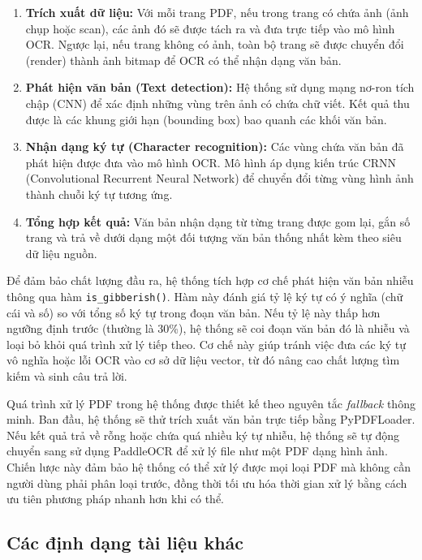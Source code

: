 \begin{enumerate}
    \item \textbf{Trích xuất dữ liệu:} Với mỗi trang PDF, nếu trong trang có chứa ảnh (ảnh chụp hoặc scan), các ảnh đó sẽ được tách ra và đưa trực tiếp vào mô hình OCR. Ngược lại, nếu trang không có ảnh, toàn bộ trang sẽ được chuyển đổi (render) thành ảnh bitmap để OCR có thể nhận dạng văn bản.

    \item \textbf{Phát hiện văn bản (Text detection):} Hệ thống sử dụng mạng nơ-ron tích chập (CNN) để xác định những vùng trên ảnh có chứa chữ viết. Kết quả thu được là các khung giới hạn (bounding box) bao quanh các khối văn bản.

    \item \textbf{Nhận dạng ký tự (Character recognition):} Các vùng chứa văn bản đã phát hiện được đưa vào mô hình OCR. Mô hình áp dụng kiến trúc CRNN (Convolutional Recurrent Neural Network) để chuyển đổi từng vùng hình ảnh thành chuỗi ký tự tương ứng.

    \item \textbf{Tổng hợp kết quả:} Văn bản nhận dạng từ từng trang được gom lại, gắn số trang và trả về dưới dạng một đối tượng văn bản thống nhất kèm theo siêu dữ liệu nguồn.
\end{enumerate}

Để đảm bảo chất lượng đầu ra, hệ thống tích hợp cơ chế phát hiện văn bản nhiễu thông qua hàm \texttt{is\_gibberish()}. Hàm này đánh giá tỷ lệ ký tự có ý nghĩa (chữ cái và số) so với tổng số ký tự trong đoạn văn bản. Nếu tỷ lệ này thấp hơn ngưỡng định trước (thường là 30\%), hệ thống sẽ coi đoạn văn bản đó là nhiễu và loại bỏ khỏi quá trình xử lý tiếp theo. Cơ chế này giúp tránh việc đưa các ký tự vô nghĩa hoặc lỗi OCR vào cơ sở dữ liệu vector, từ đó nâng cao chất lượng tìm kiếm và sinh câu trả lời.

Quá trình xử lý PDF trong hệ thống được thiết kế theo nguyên tắc \emph{fallback} thông minh. Ban đầu, hệ thống sẽ thử trích xuất văn bản trực tiếp bằng PyPDFLoader. Nếu kết quả trả về rỗng hoặc chứa quá nhiều ký tự nhiễu, hệ thống sẽ tự động chuyển sang sử dụng PaddleOCR để xử lý file như một PDF dạng hình ảnh. Chiến lược này đảm bảo hệ thống có thể xử lý được mọi loại PDF mà không cần người dùng phải phân loại trước, đồng thời tối ưu hóa thời gian xử lý bằng cách ưu tiên phương pháp nhanh hơn khi có thể.

\subsection{Các định dạng tài liệu khác}

